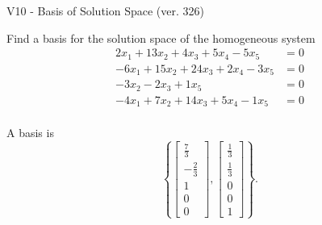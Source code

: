 \begin{exercise}
  \begin{exerciseTitle}V10 - Basis of Solution Space (ver. 326)\end{exerciseTitle}
  \begin{exerciseStatement}
    Find a basis for the solution space of the homogeneous system 
\begin{align*}
 2 x_ 1 + 13 x_ 2 + 4 x_ 3 + 5 x_ 4 -5 x_ 5 &= 0  \\ 
  -6 x_ 1 + 15 x_ 2 + 24 x_ 3 + 2 x_ 4 -3 x_ 5 &= 0  \\ 
  -3 x_ 2 -2 x_ 3 + 1 x_ 5 &= 0  \\ 
  -4 x_ 1 + 7 x_ 2 + 14 x_ 3 + 5 x_ 4 -1 x_ 5 &= 0  \\ 
 \end{align*}


 
  \end{exerciseStatement}

  \begin{exerciseAnswer}
   A basis is   
\[\left\{\left[\begin{array}{c}
\frac{7}{3} \\
-\frac{2}{3} \\
1 \\
0 \\
0
\end{array}\right] , \left[\begin{array}{c}
\frac{1}{3} \\
\frac{1}{3} \\
0 \\
0 \\
1
\end{array}\right]\right\}.\]

  


  \end{exerciseAnswer}
\end{exercise}